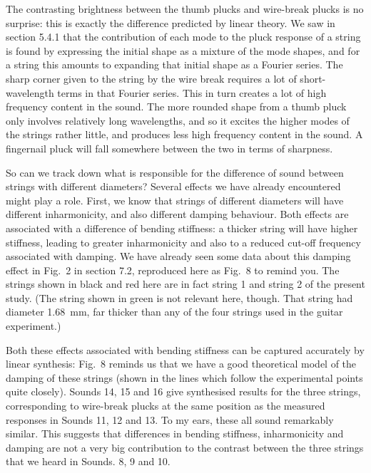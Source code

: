   The contrasting brightness between the thumb plucks and wire-break plucks is 
  no surprise: this is exactly the difference predicted by linear theory. We 
  saw in section 5.4.1 that the contribution of each mode to the pluck response 
  of a string is found by expressing the initial shape as a mixture of the mode 
  shapes, and for a string this amounts to expanding that initial shape as a 
  Fourier series. The sharp corner given to the string by the wire break 
  requires a lot of short-wavelength terms in that Fourier series. This in turn 
  creates a lot of high frequency content in the sound. The more rounded shape 
  from a thumb pluck only involves relatively long wavelengths, and so it 
  excites the higher modes of the strings rather little, and produces less high 
  frequency content in the sound. A fingernail pluck will fall somewhere 
  between the two in terms of sharpness. 

\audio{}

\audio{}

\audio{}

  So can we track down what is responsible for the difference of sound between 
  strings with different diameters? Several effects we have already encountered 
  might play a role. First, we know that strings of different diameters will 
  have different inharmonicity, and also different damping behaviour. Both 
  effects are associated with a difference of bending stiffness: a thicker 
  string will have higher stiffness, leading to greater inharmonicity and also 
  to a reduced cut-off frequency associated with damping. We have already seen 
  some data about this damping effect in Fig.\ 2 in section 7.2, reproduced 
  here as Fig.\ 8 to remind you. The strings shown in black and red here are in 
  fact string 1 and string 2 of the present study. (The string shown in green 
  is not relevant here, though. That string had diameter 1.68~mm, far thicker 
  than any of the four strings used in the guitar experiment.) 


  Both these effects associated with bending stiffness can be captured 
  accurately by linear synthesis: Fig.\ 8 reminds us that we have a good 
  theoretical model of the damping of these strings (shown in the lines which 
  follow the experimental points quite closely). Sounds 14, 15 and 16 give 
  synthesised results for the three strings, corresponding to wire-break plucks 
  at the same position as the measured responses in Sounds 11, 12 and 13. To my 
  ears, these all sound remarkably similar. This suggests that differences in 
  bending stiffness, inharmonicity and damping are not a very big contribution 
  to the contrast between the three strings that we heard in Sounds. 8, 9 and 
  10. 

